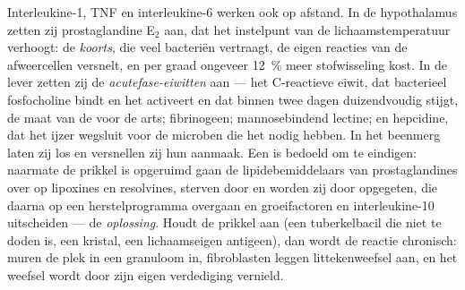 \begin{proposition}\label{prop:b3:innate-immunity:systemic}
Interleukine-1, TNF en interleukine-6 werken ook op afstand. In de
hypothalamus zetten zij prostaglandine E$_{2}$ aan, dat het instelpunt
van de lichaamstemperatuur verhoogt: de \emph{koorts}, die veel
bacteriën vertraagt, de eigen reacties van de afweercellen versnelt, en
per graad ongeveer \qty{12}{\%} meer stofwisseling kost. In de lever
zetten zij de \emph{acutefase-eiwitten} aan --- het C-reactieve eiwit,
dat bacterieel fosfocholine bindt en het  activeert en dat
binnen twee dagen duizendvoudig stijgt, de maat van de  voor
de arts; fibrinogeen; mannosebindend lectine; en hepcidine, dat het
ijzer wegsluit voor de microben die het nodig hebben. In het beenmerg
laten zij  los en versnellen zij hun aanmaak. Een
 is bedoeld om te eindigen: naarmate de prikkel is opgeruimd
gaan de lipidebemiddelaars van prostaglandines over op lipoxines en
resolvines, sterven  door  en worden zij door
 opgegeten, die daarna op een herstelprogramma overgaan en
groeifactoren en interleukine-10 uitscheiden --- de \emph{oplossing}.
Houdt de prikkel aan (een tuberkelbacil die niet te doden is, een
kristal, een lichaamseigen antigeen), dan wordt de reactie chronisch:
 muren de plek in een granuloom in, fibroblasten leggen
littekenweefsel aan, en het weefsel wordt door zijn eigen verdediging
vernield.
\end{proposition}

